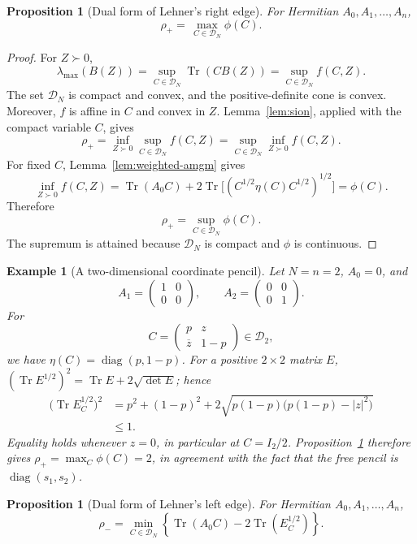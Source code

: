 \documentclass{article}
\newtheorem{proposition}[theorem]{Proposition}
\newtheorem{example}[theorem]{Example}
\newcommand{\DN}{\mathcal D_N}
\DeclareMathOperator{\Tr}{Tr}
\begin{document}
\begin{proposition}[Dual form of Lehner's right edge]
	\label{prop:dual}
	For Hermitian $A_0,A_1,\ldots,A_n$,
	\[
		\rho_+=\,\max_{C\in\DN}\phi(C).
	\]
\end{proposition}

\begin{proof}
	For $Z\succ0$,
	\[
		\lambda_{\max}(B(Z))=\sup_{C\in\DN}\Tr(CB(Z))=\sup_{C\in\DN}f(C,Z).
	\]
	The set $\DN$ is compact and convex, and the positive-definite cone is convex.
	Moreover, $f$ is affine in $C$ and convex in $Z$.  Lemma~\ref{lem:sion},
	applied with the compact variable $C$, gives
	\[
		\rho_+=
		\inf_{Z\succ0}\sup_{C\in\DN}f(C,Z)
		=
		\sup_{C\in\DN}\inf_{Z\succ0}f(C,Z).
	\]
	For fixed $C$, Lemma~\ref{lem:weighted-amgm} gives
	\[
		\inf_{Z\succ0}f(C,Z)
		=\Tr(A_0C)+2\Tr\bigl[(C^{1/2}\eta(C)C^{1/2})^{1/2}\bigr]
		=\phi(C).
	\]
	Therefore
	\[
		\rho_+=\sup_{C\in\DN}\phi(C).
	\]
	The supremum is attained because $\DN$ is compact and $\phi$ is continuous.
\end{proof}

\begin{example}[A two-dimensional coordinate pencil]
	\label{ex:dual-coordinate}
	Let \(N=n=2\), \(A_0=0\), and
	\[
		A_1=\begin{pmatrix}1&0\\0&0\end{pmatrix},
		\qquad
		A_2=\begin{pmatrix}0&0\\0&1\end{pmatrix}.
	\]
	For
	\[
		C=\begin{pmatrix}p&z\\\overline z&1-p\end{pmatrix}\in\mathcal D_2,
	\]
	we have \(\eta(C)=\operatorname{diag}(p,1-p)\).  For a positive
	\(2\times2\) matrix \(E\),
	\((\Tr E^{1/2})^2=\Tr E+2\sqrt{\det E}\); hence
	\[
		\begin{aligned}
			\bigl(\Tr E_C^{1/2}\bigr)^2
			 & =p^2+(1-p)^2
			+2\sqrt{p(1-p)\bigl(p(1-p)-|z|^2\bigr)} \\
			 & \le 1.
		\end{aligned}
	\]
	Equality holds whenever \(z=0\), in particular at \(C=I_2/2\).
	Proposition~\ref{prop:dual} therefore gives
	\(\rho_+=\max_C\phi(C)=2\), in agreement with the fact that the free
	pencil is \(\operatorname{diag}(s_1,s_2)\).
\end{example}

\begin{proposition}[Dual form of Lehner's left edge]
	\label{prop:leftdual}
	For Hermitian $A_0,A_1,\ldots,A_n$,
	\[
		\rho_-=
		\min_{C\in\DN}
		\left\{
		\Tr(A_0C)-2\Tr(E_C^{1/2})
		\right\}.
	\]
\end{proposition}
\end{document}
